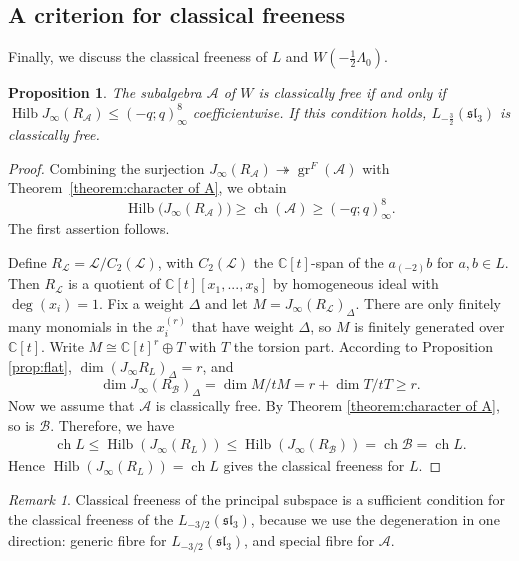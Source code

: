 \documentclass[11pt]{amsart}
\newtheorem{proposition}[theorem]{Proposition}
\theoremstyle{definition}
\theoremstyle{remark}
\newtheorem{remark}[theorem]{Remark}
\newcommand{\C}{\mathbb C}
\DeclareMathOperator{\gr}{gr}
\DeclareMathOperator{\ch}{ch}
\begin{document}
\subsection{A criterion for classical freeness}
Finally, we discuss the classical freeness of $L$ and $W(-\frac12\Lambda_0)$.
\begin{proposition}
The subalgebra $\mathcal{A}$ of $W$ is classically free if and only if $\operatorname{Hilb}J_{\infty}(R_{\mathcal{A}})\leq (-q;q)^8_{\infty}$ coefficientwise. If this  condition holds, $L_{-\frac32}(\mathfrak{sl}_3)$ is classically free. 	
\end{proposition}
\begin{proof}
Combining the surjection
$J_{\infty}(R_{\mathcal{A}})\twoheadrightarrow
\gr^F(\mathcal{A})$
with Theorem~\ref{theorem:character of A}, we obtain
\[
\operatorname{Hilb}\bigl(J_{\infty}(R_{\mathcal{A}})\bigr)
\geq \ch(\mathcal{A})
\geq (-q;q)_{\infty}^{8}.
\]
The first assertion follows. 

Define $R_{\mathscr{L}}=\mathscr{L}/C_{2}(\mathscr{L})$, with $C_2(\mathscr{L})$ the $\C[t]$-span of the $a_{(-2)}b$ for $a,b\in L$. Then $R_{\mathscr{L}}$ is a quotient of $\C[t][x_1,...,x_8]$ by homogeneous ideal with $\deg(x_i)=1$. Fix a weight $\Delta$ and let $M=J_{\infty}(R_{\mathscr{L}})_{\Delta}$. There are only finitely many monomials in the $x^{(r)}_i$ that have weight $\Delta$, so $M$ is finitely generated over $\C[t]$. Write $M\cong \C[t]^r\oplus T$ with $T$ the torsion part. According to Proposition \ref{prop:flat}, $\dim(J_{\infty}{R_{L}})_{\Delta}=r$, and 
\[\dim J_{\infty}(R_{\mathcal{B}})_{\Delta}=\dim M/tM=r+\dim T/tT\geq r.\] Now we assume that $\mathcal{A}$ is classically free. By Theorem \ref{theorem:character of A}, so is $\mathcal{B}$. Therefore, we have 
\begin{align*}
	\ch L\leq \operatorname{Hilb}(J_{\infty}(R_L))\leq \operatorname{Hilb}(J_{\infty}(R_{\mathcal{B}}))=\ch \mathcal{B}=\ch L. 
\end{align*}
Hence $\operatorname{Hilb}(J_{\infty}(R_L))=\ch L$ gives the classical freeness for $L $. 
\end{proof}
\begin{remark}
Classical freeness of the principal subspace is a sufficient condition for the classical freeness of the $L_{-3/2}(\mathfrak{sl}_3)$, because we use the degeneration in one direction: generic fibre for $L_{-3/2}(\mathfrak{sl}_3)$, and special fibre for $\mathcal{A}$.	
\end{remark}
\end{document}
